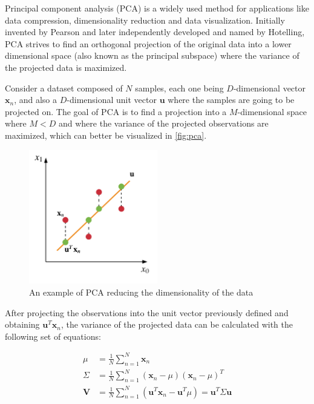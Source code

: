 \documentclass{kththesis}
\begin{document}
Principal component analysis (PCA) is a widely used method for applications like data compression, dimensionality reduction and data visualization. Initially invented by Pearson\citep{pearson1901liii} and later independently developed and named by Hotelling\citep{hotelling1933analysis}, PCA strives to find an orthogonal projection of the original data into a lower dimensional space (also known as the principal subspace) where the variance of the projected data is maximized.

Consider a dataset composed of $N$ samples, each one being $D$-dimensional vector $\mathbf{x}_n$, and also a $D$-dimensional unit vector $\mathbf{u}$ where the samples are going to be projected on. The goal of PCA is to find a projection into a $M$-dimensional space where $M < D$ and where the variance of the projected observations are maximized, which can better be visualized in \autoref{fig:pca}.

\begin{figure}[h]
    \centering
    \includegraphics[width=0.5\textwidth,keepaspectratio]{figures/pca.pdf}
    \caption{An example of PCA reducing the dimensionality of the data}
    \label{fig:pca}
\end{figure}

After projecting the observations into the unit vector previously defined and obtaining $\mathbf{u}^T\mathbf{x}_n$, the variance of the projected data can be calculated with the following set of equations:

\begin{equation}
\begin{aligned}
\mu &= \frac{1}{N}\sum_{n=1}^N \mathbf{x}_n \\
\Sigma &= \frac{1}{N}\sum_{n=1}^N (\mathbf{x}_n - \mu)(\mathbf{x}_n - \mu)^T \\
\mathbf{V} &= \frac{1}{N}\sum_{n=1}^N (\mathbf{u}^T\mathbf{x}_n - \mathbf{u}^T\mu) = \mathbf{u}^T\Sigma\mathbf{u}
\end{aligned}
\end{equation}
\end{document}
